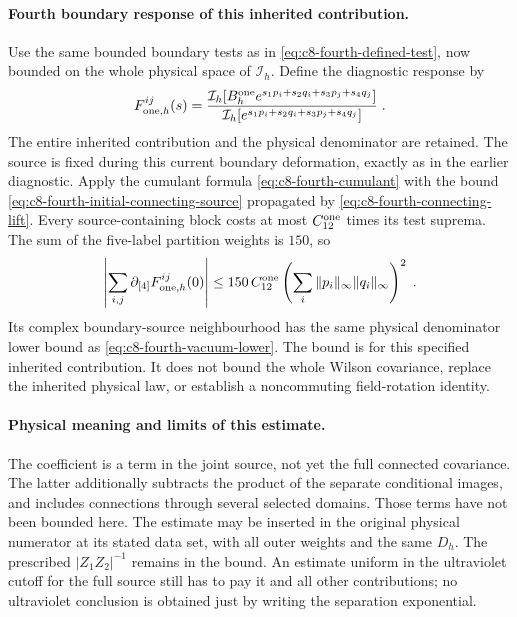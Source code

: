 \documentclass[11pt]{article}
\begin{document}
\paragraph{Fourth boundary response of this inherited contribution.}
Use the same bounded boundary tests as in
\eqref{eq:c8-fourth-defined-test}, now bounded on the whole
physical space of $\mathcal I_h$. Define the diagnostic
response by
\begin{equation}\label{eq:c8-fourth-connecting-response}
    F_{{\rm one},h}^{ij}(s)
        =\frac{\mathcal I_h[
            B_h^{\rm one}e^{s_1p_i+s_2q_i+s_3p_j+s_4q_j}]}
            {\mathcal I_h[
                e^{s_1p_i+s_2q_i+s_3p_j+s_4q_j}]}\;.
\end{equation}
The entire inherited contribution and the physical denominator
are retained. The source is fixed during this current
boundary deformation, exactly as in the earlier diagnostic.
Apply the cumulant formula
\eqref{eq:c8-fourth-cumulant} with
the bound \eqref{eq:c8-fourth-initial-connecting-source}
propagated by \eqref{eq:c8-fourth-connecting-lift}.
Every source-containing block costs at most
$C_{12}^{\rm one}$ times its test suprema. The sum of the
five-label partition weights is $150$, so
\begin{equation}\label{eq:c8-fourth-connecting-fourth-bound}
    \left|\sum_{i,j}
        \partial_{[4]}F_{{\rm one},h}^{ij}(0)\right|
        \leq150\,C_{12}^{\rm one}
            \left(\sum_i
                \|p_i\|_\infty\|q_i\|_\infty\right)^2\;.
\end{equation}
Its complex boundary-source neighbourhood has the same
physical denominator lower bound as
\eqref{eq:c8-fourth-vacuum-lower}. The bound is for this
specified inherited contribution. It does not bound the
whole Wilson covariance, replace the inherited physical
law, or establish a noncommuting field-rotation identity.

\paragraph{Physical meaning and limits of this estimate.}
The coefficient is a term in the joint source, not yet the
full connected covariance. The latter additionally subtracts
the product of the separate conditional images, and includes
connections through several selected domains. Those terms
have not been bounded here.
The estimate may be inserted in the original physical
numerator at its stated data set, with all outer weights and
the same $D_h$. The prescribed $|Z_1Z_2|^{-1}$ remains in
the bound. An estimate uniform in the ultraviolet cutoff for
the full source still has to pay it and all other contributions;
no ultraviolet conclusion
is obtained just by writing the separation exponential.
\end{document}
